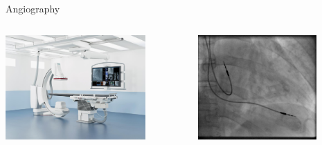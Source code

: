 \begin{frame}[c]{Angiography}

	\begin{columns}[c, onlytextwidth]
		\begin{column}{0.6\textwidth}
			\centering{}
			\includegraphics[height=4cm]{images/c-arm.jpg}\\
		\end{column}\begin{column}{0.4\textwidth}
			\centering{}
			\includegraphics[height=4cm]{images/Fluoroscopy_pacemaker_leads_right_atrium_ventricle.png}
		\end{column}
	\end{columns}


\end{frame}

